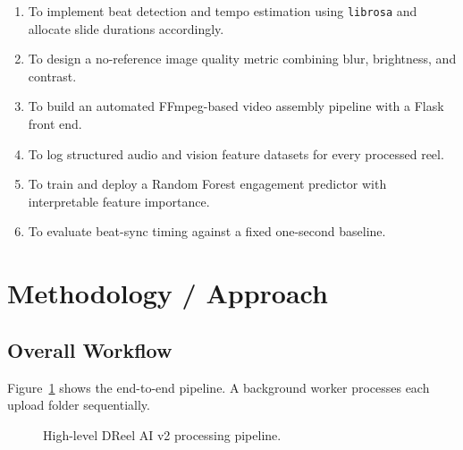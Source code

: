 \documentclass{article}
\begin{document}
\begin{enumerate}[noitemsep]
    \item To implement beat detection and tempo estimation using \texttt{librosa} and allocate slide durations accordingly.
    \item To design a no-reference image quality metric combining blur, brightness, and contrast.
    \item To build an automated FFmpeg-based video assembly pipeline with a Flask front end.
    \item To log structured audio and vision feature datasets for every processed reel.
    \item To train and deploy a Random Forest engagement predictor with interpretable feature importance.
    \item To evaluate beat-sync timing against a fixed one-second baseline.
\end{enumerate}

\section{Methodology / Approach}
\label{sec:method}

\subsection{Overall Workflow}

Figure~\ref{fig:pipeline} shows the end-to-end pipeline.
A background worker processes each upload folder sequentially.

\begin{figure}[t]
\centering
{}
\caption{High-level DReel AI v2 processing pipeline.}
\label{fig:pipeline}
\end{figure}
\end{document}
